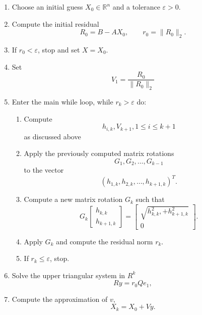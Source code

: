 \documentclass[final,1p,times]{elsarticle}
\begin{document}
\begin{algorithm}[H]
\caption{Generalized Minimal Residual Method (GMRES) to solve the elliptic euqtion}
\label{alg:gmres}
\begin{enumerate}
\item Choose an initial guess $X_0 \in \mathbb{R}^n$ and a tolerance $\varepsilon > 0$.

\item Compute the initial residual
\[
R_0 = B - A X_0, 
\qquad r_0 = \|R_0\|_2.
\]

\item If $r_0<\varepsilon$, stop and set $X = X_0$.

\item Set
\[
V_1 = \frac{R_0}{\|R_0\|_2}
\]

\item Enter the main while loop, while  $r_k >\varepsilon$  do:
\begin{enumerate}
\item Compute
\[
h_{i,k},V_{k+1}, 1\leq i  \leq k+1
\]
as discussed above

\item Apply the previously computed matrix rotations
\[
G_1, G_2, \dots, G_{k-1}
\]
to the vector
\[
(h_{1,k}, h_{2,k}, \dots, h_{k+1,k})^T.
\]

\item Compute a new matrix rotation $G_k$ such that
\[
G_k
\begin{bmatrix}
h_{k,k} \\
h_{k+1,k}
\end{bmatrix}
=
\begin{bmatrix}
\sqrt{h^2_{k,k},
+h^2_{k+1,k}} \\
0
\end{bmatrix}.
\]

\item Apply $G_k$ and compute the residual norm $r_k$.


\item If $r_k \le \varepsilon$, stop.
\end{enumerate}

\item Solve the upper triangular system in $R^k$
\[
R y = r_0Qe_1,
\]


\item Compute the approximation of $v$,
\[
X_k = X_0 + V y.
\]


\end{enumerate}
\end{algorithm}
\end{document}
